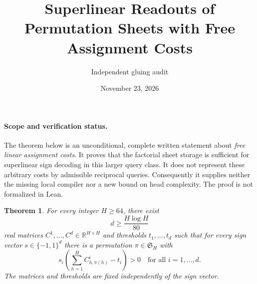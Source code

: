 \documentclass[11pt]{article}
\newtheorem{theorem}{Theorem}
\begin{document}
\title{Superlinear Readouts of Permutation Sheets with Free Assignment Costs}
\author{Independent gluing audit}
\date{November 23, 2026}
\maketitle

\paragraph{Scope and verification status.}
The theorem below is an unconditional, complete written statement about
\emph{free linear assignment costs}. It proves that the factorial sheet
storage is sufficient for superlinear sign decoding in this larger query
class. It does not represent these arbitrary costs by admissible reciprocal
queries. Consequently it supplies neither the missing local compiler nor
a new bound on head complexity. The proof is not formalized in Lean.

\begin{theorem}
For every integer $H\geq64$, there exist
\[
d\geq\frac{H\log H}{80}
\]
real matrices $C^1,\ldots,C^d\in\mathbb R^{H\times H}$ and thresholds
$t_1,\ldots,t_d$ such that for every sign vector
$s\in\{-1,1\}^d$ there is a permutation $\pi\in\mathfrak S_H$ with
\[
s_i\left(\sum_{h=1}^H C^i_{h,\pi(h)}-t_i\right)>0
\quad\text{for all }i=1,\ldots,d.
\]
The matrices and thresholds are fixed independently of the sign vector.
\end{theorem}
\end{document}
